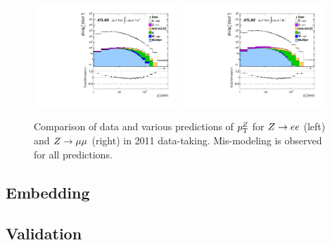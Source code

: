 \begin{figure}[tp]
  \centering
  \includegraphics[width=0.48\textwidth]{figures/STDM-2012-23/fig_01a}
  \includegraphics[width=0.48\textwidth]{figures/STDM-2012-23/fig_01b}
  \caption{Comparison of data and various predictions of $p_{\mathrm{T}}^Z$ for $Z \rightarrow ee$ (left) and $Z \rightarrow \mu\mu$ (right) in 2011 data-taking. Mis-modeling is observed for all predictions.}
  \label{fig:backgrounds-zpt}
\end{figure}

\subsection{Embedding}

\subsection{Validation}

